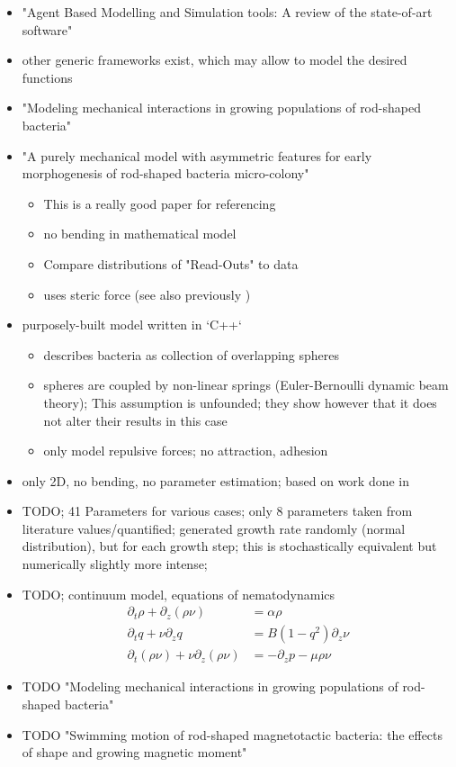 \documentclass{article}
\begin{document}
\begin{itemize}
    \item \cite{Abar2017} "Agent Based Modelling and Simulation tools: A review of the state-of-art software"
    \item other generic frameworks exist, which may allow to model the desired functions
    \item \cite{Winkle2017} "Modeling mechanical interactions in growing populations of rod-shaped bacteria"
    \item \cite{Doumic2020} "A purely mechanical model with asymmetric features for early morphogenesis of
  rod-shaped bacteria micro-colony"
    \begin{itemize}
        \item This is a really good paper for referencing
        \item no bending in mathematical model
        \item Compare distributions of "Read-Outs" to data
        \item uses steric force (see also previously \cite{Trejo2013})
    \end{itemize}
    \item \cite{Grant2014} purposely-built model written in `C++`
    \begin{itemize}
        \item describes bacteria as collection of overlapping spheres
        \item spheres are coupled by non-linear springs (Euler-Bernoulli dynamic beam theory);
        This assumption is unfounded; they show however that it does not alter their results in this
        case
        \item only model repulsive forces; no attraction, adhesion
    \end{itemize}
    \item \cite{Cho2007} only 2D, no bending, no parameter estimation; based on work done in 
        \cite{Jnsson2005}
    \item \cite{Storck2014} TODO;
    41 Parameters for various cases;
    only 8 parameters taken from literature values/quantified;
    generated growth rate randomly (normal distribution), but for each growth step; this is
      stochastically equivalent but numerically slightly more intense;
    \item \cite{Volfson2008} TODO; continuum model, equations of nematodynamics \cite{Doi1988-ad}
    \begin{align}
        \partial_t \rho + \partial_z (\rho \nu) &= \alpha \rho\\
        \partial_t q + \nu \partial_z q &= B(1-q^2) \partial_z \nu\\
        \partial_t(\rho \nu) + \nu \partial_z (\rho \nu) &= - \partial_z p - \mu \rho \nu
    \end{align}
    \item \cite{Pleyer2023} TODO "Modeling mechanical interactions in growing populations of rod-shaped bacteria"
    \item \cite{Kong2014} TODO "Swimming motion of rod-shaped magnetotactic bacteria: the effects of shape and growing magnetic moment"
\end{itemize}
\end{document}
